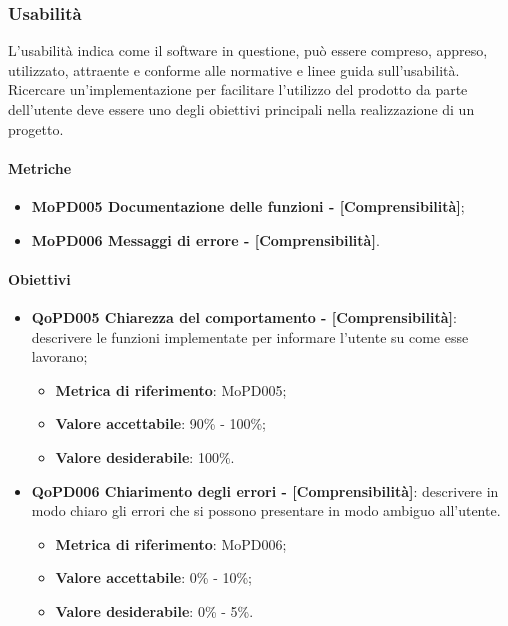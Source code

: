 \documentclass[../piano-di-qualifica.tex]{subfiles}
\begin{document}
\subsubsection{Usabilità}%
\label{sub:usabilita}
L'usabilità indica come il software in questione, può essere compreso, appreso, utilizzato, attraente e conforme alle normative e linee guida sull'usabilità.
Ricercare un'implementazione per facilitare l'utilizzo del prodotto da parte dell'utente deve essere uno degli obiettivi principali nella realizzazione di un progetto.

\paragraph{Metriche}
\label{sub:metriche}
\begin{itemize}
    \item \textbf{MoPD005 Documentazione delle funzioni - [Comprensibilità]};
    \item \textbf{MoPD006 Messaggi di errore - [Comprensibilità]}.
\end{itemize}

\paragraph{Obiettivi}
\label{sub:obiettivi}
\begin{itemize}
    \item \textbf{QoPD005 Chiarezza del comportamento - [Comprensibilità]}: descrivere le funzioni implementate per informare l'utente su come esse lavorano;
        \begin{itemize}
            \item \textbf{Metrica di riferimento}: MoPD005;
            \item \textbf{Valore accettabile}: 90\% - 100\%;
            \item \textbf{Valore desiderabile}: 100\%.
        \end{itemize}
    \item \textbf{QoPD006 Chiarimento degli errori - [Comprensibilità]}: descrivere in modo chiaro gli errori che si possono presentare in modo ambiguo all'utente.
        \begin{itemize}
            \item \textbf{Metrica di riferimento}: MoPD006;
            \item \textbf{Valore accettabile}: 0\% - 10\%;
            \item \textbf{Valore desiderabile}: 0\% - 5\%.
        \end{itemize}
\end{itemize}
\end{document}
